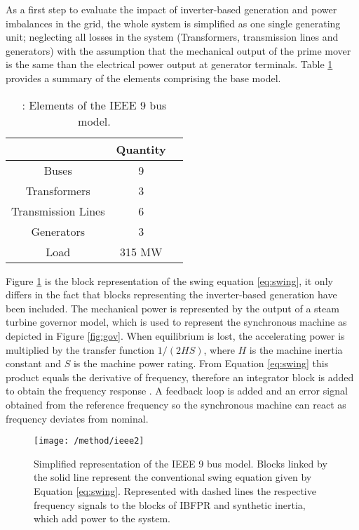 As a first step to evaluate the impact of inverter-based generation and power imbalances in the grid, the whole system is simplified as one single generating unit; neglecting all losses in the system (Transformers, transmission lines and generators) with the assumption that the mechanical output of the prime mover is the same than the electrical power output at generator terminals. Table \ref{tb:gridelements} provides a summary of the elements comprising the base model.\\




\begin{table}[h]
	\caption{\label{tb:gridelements}: Elements of the IEEE 9 bus model.}
	\centering
	\begin{tabular}{ccc}
		\toprule
		\textbf{}    & \textbf{Quantity}\\
		\midrule
		Buses & 9 \\
		Transformers & 3 \\
		Transmission Lines & 6 \\
		Generators & 3 \\
		Load & 315 MW \\
		\bottomrule
	\end{tabular}
\end{table}





Figure \ref{fig:ieeesimple} is the block representation of the swing equation \eqref{eq:swing}, it only differs in the fact that blocks representing the inverter-based generation have been included. The mechanical power is represented by the output of a steam turbine governor model, which is used to represent the synchronous machine as depicted in Figure \ref{fig:gov}. When equilibrium is lost, the accelerating power is multiplied by the transfer function $ 1/(2HS) $, where $ H $ is the machine inertia constant and $ S $ is the machine power rating. From Equation \eqref{eq:swing} this product equals the derivative of frequency, therefore an integrator block is added to obtain the frequency response \cite{kundur1994power, john1994power, ogata1999ingenieria}. A feedback loop is added and an error signal obtained from the reference frequency so the synchronous machine can react as frequency deviates from nominal.

\begin{figure}[h]
	\centering
	\texttt{[image: /method/ieee2]}
	\caption{Simplified representation of the IEEE 9 bus model. Blocks linked by the solid line represent the conventional swing equation given by Equation \eqref{eq:swing}. Represented with dashed lines the respective frequency signals to the blocks of IBFPR and synthetic inertia, which add power to the system.}
	\label{fig:ieeesimple}
\end{figure}


